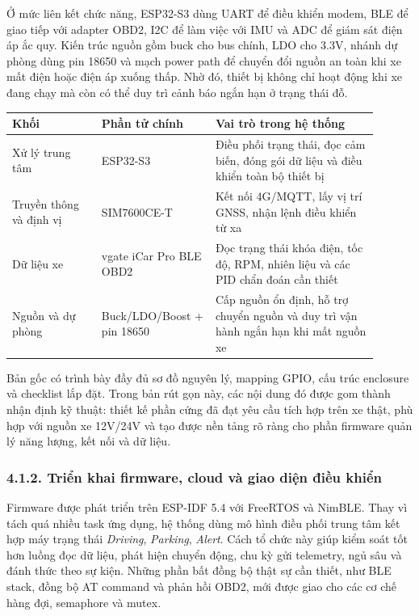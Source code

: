 \documentclass[a4paper]{extarticle}
\begin{document}
Ở mức liên kết chức năng, ESP32-S3 dùng UART để điều khiển modem, BLE để giao tiếp với adapter OBD2, I2C để làm việc với IMU và ADC để giám sát điện áp ắc quy. Kiến trúc nguồn gồm buck cho bus chính, LDO cho 3.3V, nhánh dự phòng dùng pin 18650 và mạch power path để chuyển đổi nguồn an toàn khi xe mất điện hoặc điện áp xuống thấp. Nhờ đó, thiết bị không chỉ hoạt động khi xe đang chạy mà còn có thể duy trì cảnh báo ngắn hạn ở trạng thái đỗ.

\begin{center}
\begin{tabular}{|p{0.22\linewidth}|p{0.28\linewidth}|p{0.40\linewidth}|}
\hline
\textbf{Khối} & \textbf{Phần tử chính} & \textbf{Vai trò trong hệ thống} \\
\hline
Xử lý trung tâm & ESP32-S3 & Điều phối trạng thái, đọc cảm biến, đóng gói dữ liệu và điều khiển toàn bộ thiết bị \\
\hline
Truyền thông và định vị & SIM7600CE-T & Kết nối 4G/MQTT, lấy vị trí GNSS, nhận lệnh điều khiển từ xa \\
\hline
Dữ liệu xe & vgate iCar Pro BLE OBD2 & Đọc trạng thái khóa điện, tốc độ, RPM, nhiên liệu và các PID chẩn đoán cần thiết \\
\hline
Nguồn và dự phòng & Buck/LDO/Boost + pin 18650 & Cấp nguồn ổn định, hỗ trợ chuyển nguồn và duy trì vận hành ngắn hạn khi mất nguồn xe \\
\hline
\end{tabular}
\end{center}

Bản gốc có trình bày đầy đủ sơ đồ nguyên lý, mapping GPIO, cấu trúc enclosure và checklist lắp đặt. Trong bản rút gọn này, các nội dung đó được gom thành nhận định kỹ thuật: thiết kế phần cứng đã đạt yêu cầu tích hợp trên xe thật, phù hợp với nguồn xe 12V/24V và tạo được nền tảng rõ ràng cho phần firmware quản lý năng lượng, kết nối và dữ liệu.

\subsubsection{4.1.2. Triển khai firmware, cloud và giao diện điều
khiển}\label{412-triux1ec3n-khai-firmware-cloud-vuxe0-giao-diux1ec7n-ux111iux1ec1u-khiux1ec3n}

Firmware được phát triển trên ESP-IDF 5.4 với FreeRTOS và NimBLE. Thay vì tách quá nhiều task ứng dụng, hệ thống dùng mô hình điều phối trung tâm kết hợp máy trạng thái \emph{Driving}, \emph{Parking}, \emph{Alert}. Cách tổ chức này giúp kiểm soát tốt hơn luồng đọc dữ liệu, phát hiện chuyển động, chu kỳ gửi telemetry, ngủ sâu và đánh thức theo sự kiện. Những phần bất đồng bộ thật sự cần thiết, như BLE stack, đồng bộ AT command và phản hồi OBD2, mới được giao cho các cơ chế hàng đợi, semaphore và mutex.
\end{document}
